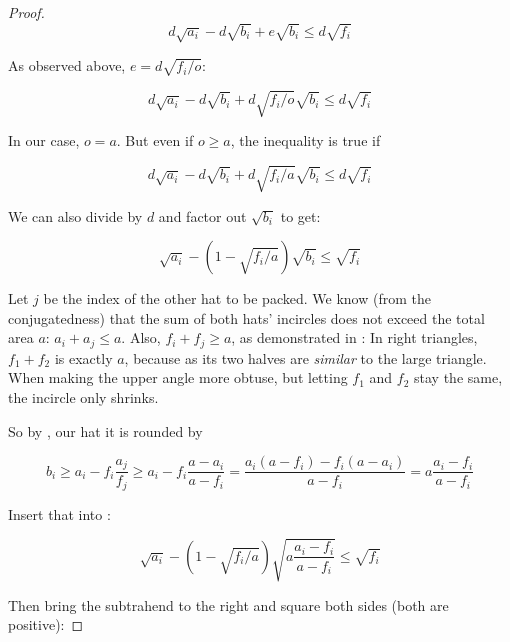 \documentclass[a4paper,style=print,oneside,bibliography=totoc,nexus,lnum,extramargin]{tubsbook}
\begin{document}
\begin{proof}
    \begin{equation*}
        d\sqrt{a_i} - d\sqrt{b_i} + e\sqrt{b_i} \le d\sqrt{f_i}
    \end{equation*}

    As observed above, $e = d\sqrt{f_i/o}$:

    \begin{equation*}
        d\sqrt{a_i} - d\sqrt{b_i} + d\sqrt{f_i/o}\sqrt{b_i} \le d\sqrt{f_i}
    \end{equation*}

    In our case, $o = a$. But even if $o \ge a$, the inequality is true if

    \begin{equation*}
        d\sqrt{a_i} - d\sqrt{b_i} + d\sqrt{f_i/a}\sqrt{b_i} \le d\sqrt{f_i}
    \end{equation*}

    We can also divide by $d$ and factor out $\sqrt{b_i}$ to get:

    \begin{equation}\label{eq:tripoke}
        \sqrt{a_i} - (1-\sqrt{f_i/a})\sqrt{b_i} \le \sqrt{f_i}
    \end{equation}


    Let $j$ be the index of the other hat to be packed.
    We know (from the conjugatedness) that the sum of both hats' incircles does not exceed the total area $a$: $a_i + a_j \le a$. Also, $f_i + f_j \ge a$, as demonstrated in : In right triangles, $f_1 + f_2$ is exactly $a$, because as its two halves are \emph{similar} to the large triangle. When making the upper angle more obtuse, but letting $f_1$ and $f_2$ stay the same, the incircle only shrinks.

    So by , our hat it is rounded by

    $$b_i \ge a_i - f_i\frac{a_j}{f_j} \ge a_i - f_i\frac{a-a_i}{a-f_i} = \frac{a_i(a-f_i)-f_i(a-a_i)}{a-f_i} = a\frac{a_i-f_i}{a-f_i}$$

    Insert that into :

    $$\sqrt{a_i} - (1-\sqrt{f_i/a})\sqrt{a\frac{a_i-f_i}{a-f_i}} \le \sqrt{f_i}$$

    Then bring the subtrahend to the right and square both sides (both are positive):


\end{proof}
\end{document}
